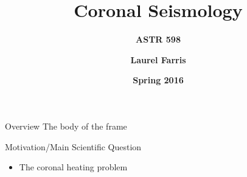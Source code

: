 \documentclass[table]{beamer}
\title{\textbf{Coronal Seismology}}
\subtitle{\textbf{ASTR 598}}
\date{\textbf{Spring 2016}}
\author{\textbf{Laurel Farris}}
\begin{document}
{
\begin{frame}
    \titlepage{}
\end{frame}}%

\begin{frame}{Overview}
    The body of the frame
\end{frame}%

\begin{frame}{Motivation/Main Scientific Question}
    \begin{itemize}
        \item The coronal heating problem
    \end{itemize}
\end{frame}%
\end{document}
